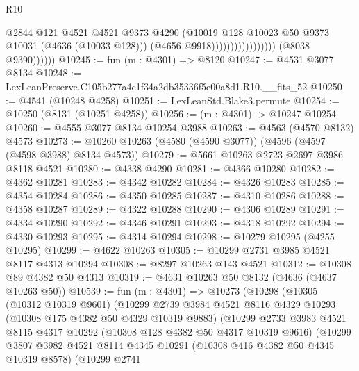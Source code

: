 \begin{lexlean}{R10}
\begin{coremodule}
                                              @2844
                                              @121
                                              @4521
                                              @4521
                                              @9373
                                              @4290
                                              (@10019
                                                @128
                                                @10023
                                                @50
                                                @9373
                                                @10031
                                                (@4636 (@10033 @128)))
                                              (@4656 @9918)))))))))))))))))
              (@8038 @9390))))))
@10245 := fun (m : @4301) => @8120
@10247 := @4531 @3077 @8134
@10248 := LexLeanPreserve.C105b277a4c1f34a2db35336f5e00a8d1.R10.__fits_52
@10250 := @4541 (@10248 @4258)
@10251 := LexLeanStd.Blake3.permute
@10254 := @10250 (@8131 (@10251 @4258))
@10256 := (m : @4301) -> @10247 @10254
@10260 := @4555 @3077 @8134 @10254 @3988
@10263 := @4563 (@4570 @8132) @4573
@10273 := @10260 @10263 (@4580 (@4590 @3077)) (@4596 (@4597 (@4598 @3988) @8134 @4573))
@10279 := @5661 @10263 @2723 @2697 @3986 @8118 @4521
@10280 := @4338 @4290
@10281 := @4366 @10280
@10282 := @4362 @10281
@10283 := @4342 @10282
@10284 := @4326 @10283
@10285 := @4354 @10284
@10286 := @4350 @10285
@10287 := @4310 @10286
@10288 := @4358 @10287
@10289 := @4322 @10288
@10290 := @4306 @10289
@10291 := @4334 @10290
@10292 := @4346 @10291
@10293 := @4318 @10292
@10294 := @4330 @10293
@10295 := @4314 @10294
@10298 := @10279 @10295 (@4255 @10295)
@10299 := @4622 @10263
@10305 := @10299 @2731 @3985 @4521 @8117 @4313 @10294
@10308 := @8297 @10263 @143 @4521
@10312 := @10308 @89 @4382 @50 @4313
@10319 := @4631 @10263 @50 @8132 (@4636 (@4637 @10263 @50))
@10539 := fun (m : @4301) =>
  @10273
    (@10298
      (@10305
        (@10312 @10319 @9601)
        (@10299
          @2739
          @3984
          @4521
          @8116
          @4329
          @10293
          (@10308 @175 @4382 @50 @4329 @10319 @9883)
          (@10299
            @2733
            @3983
            @4521
            @8115
            @4317
            @10292
            (@10308 @128 @4382 @50 @4317 @10319 @9616)
            (@10299
              @3807
              @3982
              @4521
              @8114
              @4345
              @10291
              (@10308 @416 @4382 @50 @4345 @10319 @8578)
              (@10299
                @2741

\end{coremodule}
\end{lexlean}
